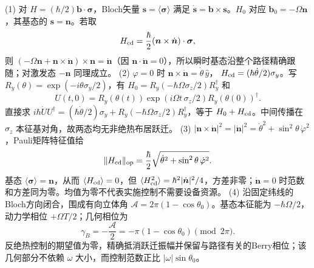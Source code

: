 (1) 对 \(H=(\hbar/2)\boldsymbol b\cdot\boldsymbol\sigma\)，Bloch矢量 \(\boldsymbol s=\langle\boldsymbol\sigma\rangle\) 满足 \(\dot{\boldsymbol s}=\boldsymbol b\times\boldsymbol s\)。\(H_0\) 对应 \(\boldsymbol b_0=-\Omega\boldsymbol n\)，其基态的 \(\boldsymbol s=\boldsymbol n\)。若取
\[
H_{\rm cd}=\frac{\hbar}{2}(\boldsymbol n\times\dot{\boldsymbol n})\cdot\boldsymbol\sigma,
\]
则 \((-\Omega\boldsymbol n+\boldsymbol n\times\dot{\boldsymbol n})\times\boldsymbol n=\dot{\boldsymbol n}\)（因 \(\boldsymbol n\cdot\dot{\boldsymbol n}=0\)），所以瞬时基态沿整个路径精确跟随；对激发态 \(-\boldsymbol n\) 同理成立。
(2) \(\varphi=0\) 时 \(\boldsymbol n\times\dot{\boldsymbol n}=\dot\theta\,\hat y\)，
\(H_{\rm cd}=(\hbar\dot\theta/2)\sigma_y\)。写 \(R_y(\theta)=\exp(-i\theta\sigma_y/2)\)，有 \(H_0=R_y(-\hbar\Omega\sigma_z/2)R_y^\dagger\) 和
\[
U(t,0)=R_y(\theta(t))\exp(i\Omega t\,\sigma_z/2)R_y(\theta(0))^\dagger.
\]
直接求 \(i\hbar\dot U U^\dagger=
(\hbar\dot\theta/2)\sigma_y+
R_y(-\hbar\Omega\sigma_z/2)R_y^\dagger\)，等于 \(H_0+H_{\rm cd}\)。中间传播在 \(\sigma_z\) 本征基对角，故两态均无非绝热布居跃迁。
(3) \(|\boldsymbol n\times\dot{\boldsymbol n}|^2=|\dot{\boldsymbol n}|^2=\dot\theta^2+\sin^2\theta\,\dot\varphi^2\)，Pauli矩阵特征值给
\[
\|H_{\rm cd}\|_{\rm op}=\frac{\hbar}{2}
\sqrt{\dot\theta^2+\sin^2\theta\,\dot\varphi^2}.
\]
基态 \(\langle\boldsymbol\sigma\rangle=\boldsymbol n\)，从而 \(\langle H_{\rm cd}\rangle=0\)，但 \(\langle H_{\rm cd}^2\rangle=\hbar^2|\dot{\boldsymbol n}|^2/4\)，方差非零；\(\dot{\boldsymbol n}=0\) 时范数和方差同为零。均值为零不代表实施控制不需要设备资源。
(4) 沿固定纬线的Bloch方向闭合，围成有向立体角 \(\mathcal A=2\pi(1-\cos\theta_0)\)。基态本征能为 \(-\hbar\Omega/2\)，动力学相位 \(+\Omega T/2\)；几何相位为
\[
\gamma_B=-\frac{\mathcal A}{2}=-\pi(1-\cos\theta_0)\pmod{2\pi}.
\]
反绝热控制的期望值为零，精确抵消跃迁振幅并保留与路径有关的Berry相位；该几何部分不依赖 \(\omega\) 大小，而控制范数正比 \(|\omega|\sin\theta_0\)。
